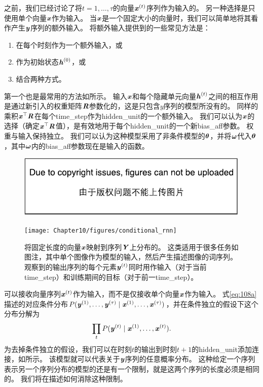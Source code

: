 
之前，我们已经讨论了将$t =1, \dots, \tau$的向量$\boldsymbol{\mathit{x}}^{(t)}$序列作为输入的。
另一种选择是只使用单个向量$\boldsymbol{\mathit{x}}$作为输入。
当$\boldsymbol{\mathit{x}}$是一个固定大小的向量时，我们可以简单地将其看作产生$\boldsymbol{\mathit{y}}$序列的额外输入。
将额外输入提供到的一些常见方法是：
\begin{enumerate}
 \item 在每个时刻作为一个额外输入，或
 \item 作为初始状态$\boldsymbol{\mathit{h}}^{(0)}$，或
 \item 结合两种方式。
\end{enumerate}

第一个也是最常用的方法如所示。
输入$\boldsymbol{\mathit{x}}$和每个隐藏单元向量$\boldsymbol{\mathit{h}}^{(t)}$之间的相互作用是通过新引入的权重矩阵$\boldsymbol{\mathit{R}}$参数化的，这是只包含$y$序列的模型所没有的。
同样的乘积$\boldsymbol{\mathit{x}}^\top\boldsymbol{\mathit{R}}$在每个\gls{time_step}作为\gls{hidden_unit}的一个额外输入。
我们可以认为$\boldsymbol{\mathit{x}}$的选择（确定$\boldsymbol{\mathit{x}}^\top\boldsymbol{\mathit{R}}$值），是有效地用于每个\gls{hidden_unit}的一个新\gls{bias_aff}参数。
权重与输入保持独立。
我们可以认为这种模型采用了非条件模型的$\boldsymbol{\theta}$，并将$\boldsymbol{\omega}$代入$\boldsymbol{\theta}$，其中$\boldsymbol{\omega}$内的\gls{bias_aff}参数现在是输入的函数。

\begin{figure}[!htb]
\ifOpenSource
\centerline{\includegraphics{figure.pdf}}
\else
\centerline{\texttt{[image: Chapter10/figures/conditional\_rnn]}}
\fi
\caption{将固定长度的向量$\boldsymbol{\mathit{x}}$映射到序列$\boldsymbol{\mathit{Y}}$上分布的。
这类适用于很多任务如图注，其中单个图像作为模型的输入，然后产生描述图像的词序列。
观察到的输出序列的每个元素$\boldsymbol{\mathit{y}}^{(t)}$同时用作输入（对于当前\gls{time_step}）和训练期间的目标（对于前一\gls{time_step}）。
}
\label{fig:chap10_conditional_rnn}
\end{figure}


可以接收向量序列$\boldsymbol{\mathit{x}}^{(t)}$作为输入，而不是仅接收单个向量$\boldsymbol{\mathit{x}}$作为输入。
式\eqref{eq:108a}描述的对应条件分布$P(\boldsymbol{\mathit{y}}^{(1)}, \dots, \boldsymbol{\mathit{y}}^{(\tau)} \mid \boldsymbol{\mathit{x}}^{(1)}, \dots, \boldsymbol{\mathit{x}}^{(\tau)})$，并在条件独立的假设下这个分布分解为
\begin{align}
 \prod_t P(\boldsymbol{\mathit{y}}^{(t)} \mid \boldsymbol{\mathit{x}}^{(1)}, \dots, \boldsymbol{\mathit{x}}^{(t)}).
\end{align}
为去掉条件独立的假设，我们可以在时刻$t$的输出到时刻$t+1$的\gls{hidden_unit}添加连接，如所示。
该模型就可以代表关于$\boldsymbol{\mathit{y}}$序列的任意概率分布。
这种给定一个序列表示另一个序列分布的模型的还是有一个限制，就是这两个序列的长度必须是相同的。
我们将在描述如何消除这种限制。

